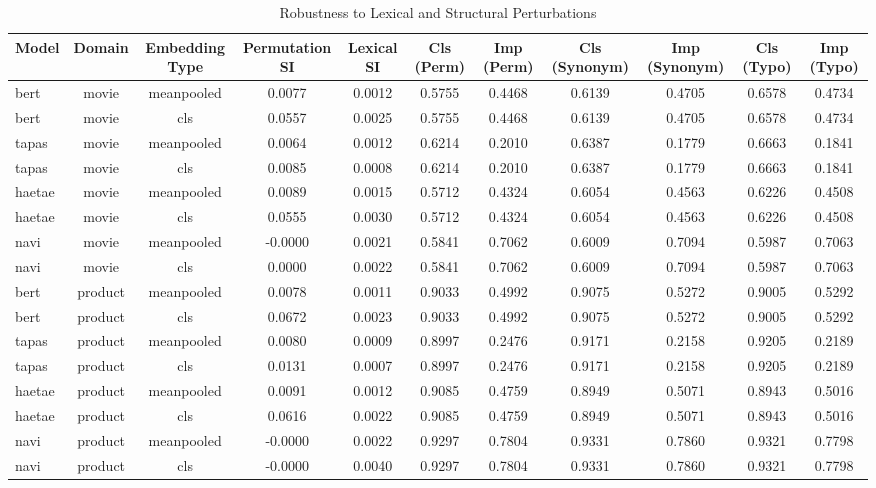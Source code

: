 \begin{table}
\centering
\begin{tabular}{lcccccccccc}
\toprule
Model & Domain & Embedding Type & Permutation SI & Lexical SI & Cls (Perm) & Imp (Perm) & Cls (Synonym) & Imp (Synonym) & Cls (Typo) & Imp (Typo) \\
\midrule
bert & movie & meanpooled & 0.0077 & 0.0012 & 0.5755 & 0.4468 & 0.6139 & 0.4705 & 0.6578 & 0.4734 \\
bert & movie & cls & 0.0557 & 0.0025 & 0.5755 & 0.4468 & 0.6139 & 0.4705 & 0.6578 & 0.4734 \\
tapas & movie & meanpooled & 0.0064 & 0.0012 & 0.6214 & 0.2010 & 0.6387 & 0.1779 & 0.6663 & 0.1841 \\
tapas & movie & cls & 0.0085 & 0.0008 & 0.6214 & 0.2010 & 0.6387 & 0.1779 & 0.6663 & 0.1841 \\
haetae & movie & meanpooled & 0.0089 & 0.0015 & 0.5712 & 0.4324 & 0.6054 & 0.4563 & 0.6226 & 0.4508 \\
haetae & movie & cls & 0.0555 & 0.0030 & 0.5712 & 0.4324 & 0.6054 & 0.4563 & 0.6226 & 0.4508 \\
navi & movie & meanpooled & -0.0000 & 0.0021 & 0.5841 & 0.7062 & 0.6009 & 0.7094 & 0.5987 & 0.7063 \\
navi & movie & cls & 0.0000 & 0.0022 & 0.5841 & 0.7062 & 0.6009 & 0.7094 & 0.5987 & 0.7063 \\
bert & product & meanpooled & 0.0078 & 0.0011 & 0.9033 & 0.4992 & 0.9075 & 0.5272 & 0.9005 & 0.5292 \\
bert & product & cls & 0.0672 & 0.0023 & 0.9033 & 0.4992 & 0.9075 & 0.5272 & 0.9005 & 0.5292 \\
tapas & product & meanpooled & 0.0080 & 0.0009 & 0.8997 & 0.2476 & 0.9171 & 0.2158 & 0.9205 & 0.2189 \\
tapas & product & cls & 0.0131 & 0.0007 & 0.8997 & 0.2476 & 0.9171 & 0.2158 & 0.9205 & 0.2189 \\
haetae & product & meanpooled & 0.0091 & 0.0012 & 0.9085 & 0.4759 & 0.8949 & 0.5071 & 0.8943 & 0.5016 \\
haetae & product & cls & 0.0616 & 0.0022 & 0.9085 & 0.4759 & 0.8949 & 0.5071 & 0.8943 & 0.5016 \\
navi & product & meanpooled & -0.0000 & 0.0022 & 0.9297 & 0.7804 & 0.9331 & 0.7860 & 0.9321 & 0.7798 \\
navi & product & cls & -0.0000 & 0.0040 & 0.9297 & 0.7804 & 0.9331 & 0.7860 & 0.9321 & 0.7798 \\
\bottomrule
\end{tabular}
\caption{Robustness to Lexical and Structural Perturbations}
\label{tab:robustness}
\end{table}

